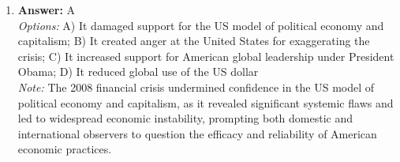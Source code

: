\documentclass[12pt]{article}
\begin{document}
\begin{enumerate}[label=\arabic*.]
\\ \textit{Note:} The phrase "indiscriminate attack" suggests a lack of precision and accountability, which undermines the notion of legitimacy typically associated with the principles of the Revolution in Military Affairs (RMA) that emphasize targeted and ethical military operations.
\item \textbf{Answer:} A
\\ \textit{Options:} A) It damaged support for the US model of political economy and capitalism; B) It created anger at the United States for exaggerating the crisis; C) It increased support for American global leadership under President Obama; D) It reduced global use of the US dollar
\\ \textit{Note:} The 2008 financial crisis undermined confidence in the US model of political economy and capitalism, as it revealed significant systemic flaws and led to widespread economic instability, prompting both domestic and international observers to question the efficacy and reliability of American economic practices.
\end{enumerate}
\end{document}
